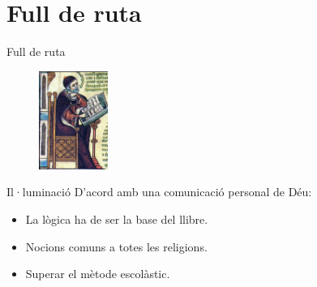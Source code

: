 \documentclass{beamer}
\begin{document}
\section{Full de ruta}

\begin{frame}{Full de ruta}

\begin{figure}
\includegraphics[width=0.2\textwidth]{llull}
\end{figure}

\begin{block}{Il·luminació}
D'acord amb una comunicació personal de Déu:
\begin{itemize}
\item La lògica ha de ser la base del llibre.
\item Nocions comuns a totes les religions.
\item Superar el mètode escolàstic.
\end{itemize}
\end{block}

\end{frame}
\end{document}
